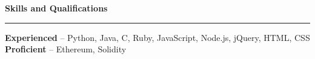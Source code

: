 \documentclass[11pt,letterpaper]{article}
\newenvironment{topic}[1]
    {
    {\Large \centerline{#1}}
    \vspace*{0.03in}
    \hrule 
    \vspace*{0.05in}
    }
    {}
\newenvironment{detail}
    {
    \normalsize
    }
    {
    \vspace*{0.02in}
    }
\begin{document}
    \begin{topic}{\textbf{Skills and Qualifications}}
        \begin{detail}
            \textbf{Experienced} -- Python, Java, C, Ruby, JavaScript, Node.js, jQuery, HTML, CSS\\
            \textbf{Proficient} -- Ethereum, Solidity
        \end{detail}
    \end{topic}
\end{document}
